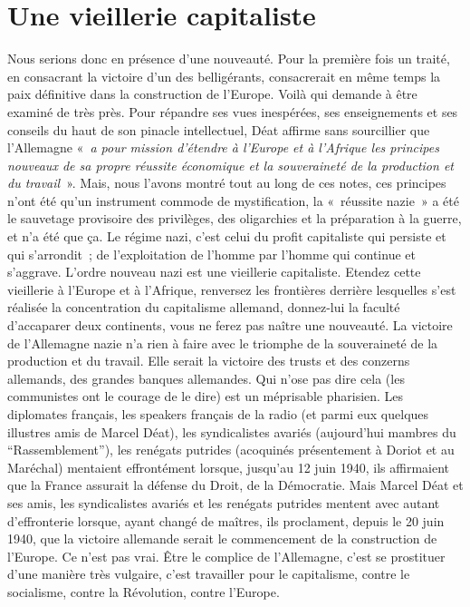 \documentclass[french,twoside]{book} %
\begin{document}
\section[Une vieillerie capitaliste]{Une vieillerie capitaliste}
\noindent Nous serions donc en présence d’une nouveauté. Pour la première fois un traité, en consacrant la victoire d’un des belligérants, consacrerait en même temps la paix définitive dans la construction de l’Europe. Voilà qui demande à être examiné de très près. Pour répandre ses vues inespérées, ses enseignements et ses conseils du haut de son pinacle intellectuel, Déat affirme sans sourcillier que l’Allemagne « \emph{a pour mission d’étendre à l’Europe et à l’Afrique les principes nouveaux de sa propre réussite économique et la souveraineté de la production et du travail} ». Mais, nous l’avons montré tout au long de ces notes, ces principes n’ont été qu’un instrument commode de mystification, la « réussite nazie » a été le sauvetage provisoire des privilèges, des oligarchies et la préparation à la guerre, et n’a été que ça. Le régime nazi, c’est celui du profit capitaliste qui persiste et qui s’arrondit ; de l’exploitation de l’homme par l’homme qui continue et s’aggrave. L’ordre nouveau nazi est une vieillerie capitaliste. Etendez cette vieillerie à l’Europe et à l’Afrique, renversez les frontières derrière lesquelles s’est réalisée la concentration du capitalisme allemand, donnez-lui la faculté d’accaparer deux continents, vous ne ferez pas naître une nouveauté. La victoire de l’Allemagne nazie n’a rien à faire avec le triomphe de la souveraineté de la production et du travail. Elle serait la victoire des trusts et des conzerns allemands, des grandes banques allemandes. Qui n’ose pas dire cela (les communistes ont le courage de le dire) est un méprisable pharisien. Les diplomates français, les speakers français de la radio (et parmi eux quelques illustres amis de Marcel Déat), les syndicalistes avariés (aujourd’hui mambres du “Rassemblement”), les renégats putrides (acoquinés présentement à Doriot et au Maréchal) mentaient effrontément lorsque, jusqu’au 12 juin 1940, ils affirmaient que la France assurait la défense du Droit, de la Démocratie. Mais Marcel Déat et ses amis, les syndicalistes avariés et les renégats putrides mentent avec autant d’effronterie lorsque, ayant changé de maîtres, ils proclament, depuis le 20 juin 1940, que la victoire allemande serait le commencement de la construction de l’Europe. Ce n’est pas vrai. Être le complice de l’Allemagne, c’est se prostituer d’une manière très vulgaire, c’est travailler pour le capitalisme, contre le socialisme, contre la Révolution, contre l’Europe.
\end{document}
